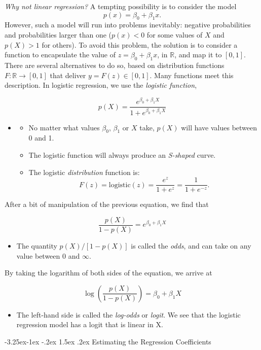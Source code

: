\documentclass[]{book}
\makeatletter
\providecommand{\tightlist}{%
  \setlength{\itemsep}{0pt}\setlength{\parskip}{0pt}}
\newenvironment{rmdblock}[1]
  {\begin{shaded*}
  \begin{itemize}
  \renewcommand{\labelitemi}{
    \raisebox{-.7\height}[0pt][0pt]{
      {\setkeys{Gin}{width=2em,keepaspectratio}\texttt{[image: img/icons/\#1]}}
    }
  }
  \item
  }
  {
  \end{itemize}
  \end{shaded*}
  }
\newenvironment{rmdinsight}
  {\begin{rmdblock}{insight}}
  {\end{rmdblock}}
\renewcommand\subsection{\@startsection{subsection}{2}{\z@}%
                                     {-3.25ex\@plus -1ex \@minus -.2ex}%
                                     {1.5ex \@plus .2ex}%
                                     {\normalfont\large\bfseries\color{Violet}}}
\theoremstyle{definition}
\theoremstyle{definition}
\theoremstyle{definition}
\theoremstyle{remark}
\makeatother
\begin{document}
\emph{Why not linear regression?} A tempting possibility is to consider
the model \[
p(x)=\beta_0+\beta_1 x.
\] However, such a model will run into problems inevitably: negative
probabilities and probabilities larger than one (\(p(x) < 0\) for some
values of \(X\) and \(p(X) > 1\) for others). To avoid this problem, the
solution is to consider a function to encapsulate the value of
\(z=\beta_0+\beta_1 x\), in \(\mathbb{R}\), and map it to \([0,1]\).
There are several alternatives to do so, based on distribution functions
\(F:\mathbb{R}\longrightarrow[0,1]\) that deliver \(y=F(z)\in[0,1]\).
Many functions meet this description. In logistic regression, we use the
\emph{logistic function},

\[ p(X) = \frac{e^{\beta_0 + \beta_1 X}}{1+e^{\beta_0 + \beta_1 X}} \]

\begin{rmdinsight}
\begin{itemize}
\tightlist
\item
  No matter what values \(\beta_0\), \(\beta_1\) or \(X\) take, \(p(X)\)
  will have values between 0 and 1.
\item
  The logistic function will always produce an \emph{S-shaped} curve.
\item
  The logistic \emph{distribution} function is:
  \[F(z)=\mathrm{logistic}(z)=\frac{e^z}{1+e^z}=\frac{1}{1+e^{-z}}.\]
\end{itemize}
\end{rmdinsight}

After a bit of manipulation of the previous equation, we find that

\[ \frac{p(X)}{1-p(X)} = e^{\beta_0 + \beta_1 X} \]

\begin{rmdinsight}
The quantity \(p(X)/[1−p(X)]\) is called the \emph{odds}, and can take
on any value between \(0\) and \(\infty\).
\end{rmdinsight}

By taking the logarithm of both sides of the equation, we arrive at

\[ \log( \frac{p(X)}{1-p(X)} ) = \beta_0 + \beta_1 X \]

\begin{rmdinsight}
The left-hand side is called the \emph{log-odds} or \emph{logit}. We see
that the logistic regression model has a logit that is linear in X.
\end{rmdinsight}

\subsection{Estimating the Regression
Coefficients}\label{estimating-the-regression-coefficients-1}
\end{document}
